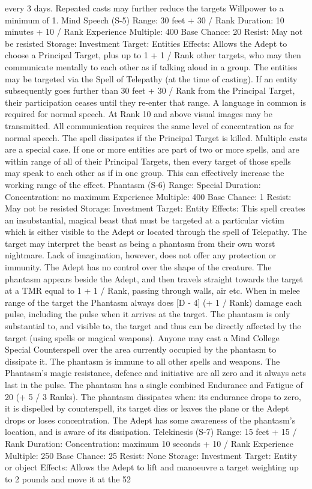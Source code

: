 \documentclass[a4paper]{article}
\begin{document}
\begin{multicols}{3}
every 3 days. Repeated casts may further reduce
the targets Willpower to a minimum of 1.
Mind Speech (S-5)
Range: 30 feet + 30 / Rank
Duration: 10 minutes + 10 / Rank
Experience Multiple: 400
Base Chance: 20%
Resist: May not be resisted
Storage: Investment
Target: Entities
Effects: Allows the Adept to choose a Principal
Target, plus up to 1 + 1 / Rank other targets, who
may then communicate mentally to each other as if
talking aloud in a group. The entities may be targeted via the Spell of Telepathy (at the time of
casting). If an entity subsequently goes further than
30 feet + 30 / Rank from the Principal Target, their
participation ceases until they re-enter that range.
A language in common is required for normal
speech. At Rank 10 and above visual images may
be transmitted. All communication requires the
same level of concentration as for normal speech.
The spell dissipates if the Principal Target is killed.
Multiple casts are a special case. If one or more
entities are part of two or more spells, and are
within range of all of their Principal Targets, then
every target of those spells may speak to each other
as if in one group. This can effectively increase the
working range of the effect.
Phantasm (S-6)
Range: Special
Duration: Concentration: no maximum
Experience Multiple: 400
Base Chance: 1%
Resist: May not be resisted
Storage: Investment
Target: Entity
Effects: This spell creates an insubstantial, magical
beast that must be targeted at a particular victim
which is either visible to the Adept or located
through the spell of Telepathy. The target may
interpret the beast as being a phantasm from their
own worst nightmare. Lack of imagination, however, does not offer any protection or immunity.
The Adept has no control over the shape of the
creature.
The phantasm appears beside the Adept, and then
travels straight towards the target at a TMR equal
to 1 + 1 / Rank, passing through walls, air etc.
When in melee range of the target the Phantasm
always does [D - 4] (+ 1 / Rank) damage each
pulse, including the pulse when it arrives at the
target.
The phantasm is only substantial to, and visible to,
the target and thus can be directly affected by the
target (using spells or magical weapons). Anyone
may cast a Mind College Special Counterspell over
the area currently occupied by the phantasm to
dissipate it. The phantasm is immune to all other
spells and weapons.
The Phantasm’s magic resistance, defence and
initiative are all zero and it always acts last in the
pulse. The phantasm has a single combined Endurance and Fatigue of 20 (+ 5 / 3 Ranks).
The phantasm dissipates when: its endurance drops
to zero, it is dispelled by counterspell, its target
dies or leaves the plane or the Adept drops or loses
concentration. The Adept has some awareness of
the phantasm’s location, and is aware of its dissipation.
Telekinesis (S-7)
Range: 15 feet + 15 / Rank
Duration: Concentration: maximum 10 seconds +
10 / Rank
Experience Multiple: 250
Base Chance: 25%
Resist: None
Storage: Investment
Target: Entity or object
Effects: Allows the Adept to lift and manoeuvre a
target weighting up to 2 pounds and move it at the
52


\end{multicols}
\end{document}
